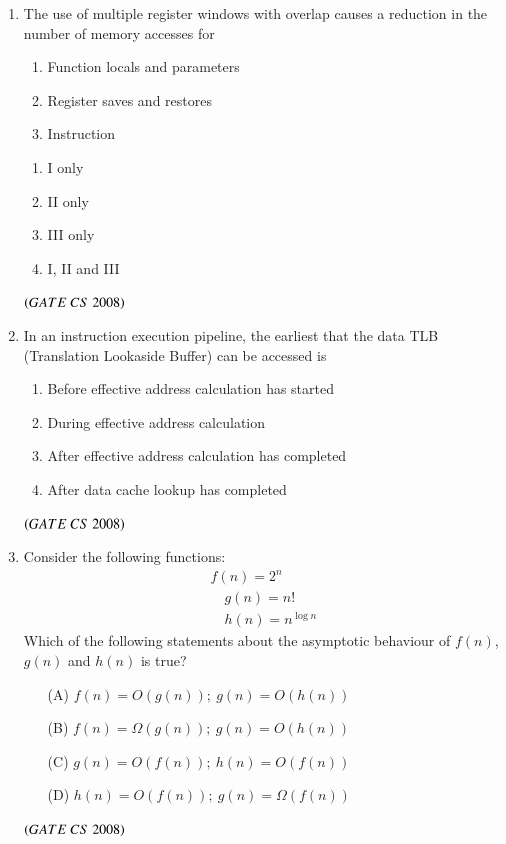 \documentclass[journal, onecolumn]{IEEEtran}
\numberwithin{equation}{enumi}
\numberwithin{figure}{enumi}
\begin{document}
\begin{enumerate}
\item The use of multiple register windows with overlap causes a reduction in the number of memory accesses for 
\begin{enumerate} [label=\Roman*.]
   \item Function locals and parameters
   \item Register saves and restores
   \item Instruction
\end{enumerate}
\vspace{-1em}%
\begin{multicols}{4}
\begin{enumerate}
   \item  I only
   \item  II only
   \item  III only
   \item  I, II and III
\end{enumerate}
\end{multicols}
\hfill $\left(GATE\ CS\  2008\right)$

\item In an instruction execution pipeline, the earliest that the data TLB (Translation Lookaside Buffer) can be accessed is 
\begin{enumerate}
   \item Before effective address calculation has started
   \item During effective address calculation
   \item After effective address calculation has completed
   \item After data cache lookup has completed
\end{enumerate}
\hfill $\left(GATE\ CS\  2008\right)$
\bigskip

\item Consider the following functions:
\begin{align*}
f(n) = 2^n \\
\quad g(n) = n!\\
\quad h(n) = n^{\log n}
\end{align*}
Which of the following statements about the asymptotic behaviour of $f(n)$, $g(n)$ and $h(n)$ is true?
\vspace{-1em}%
\begin{multicols}{2}
\begin{enumerate}
    \item[(A)] $f(n) = O(g(n));\ g(n) = O(h(n))$
    \item[(B)] $f(n) = \Omega(g(n));\ g(n) = O(h(n))$
    \item[(C)] $g(n) = O(f(n));\ h(n) = O(f(n))$
    \item[(D)] $h(n) = O(f(n));\ g(n) = \Omega(f(n))$
\end{enumerate}
\end{multicols}
\hfill $\left(GATE\ CS\  2008\right)$


\end{enumerate}
\end{document}

